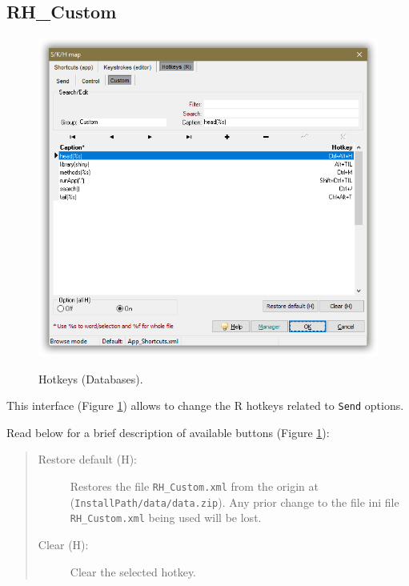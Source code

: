 \subsection{RH\_Custom}

\begin{figure}[H]
  \includegraphics[scale=0.35]{./res/skh_map_rh_custom_dlg.png}\\
  \caption{Hotkeys (Databases).}
  \label{fig:rh_custom_dlg}
\end{figure}

This interface
(Figure \ref{fig:rh_custom_dlg})
allows to change the R hotkeys related to \texttt{Send} options.

Read below for a brief description of available buttons (Figure \ref{fig:rh_custom_dlg}):

\begin{quote}
  \begin{footnotesize}
    \begin{description}
      \item[Restore default (H):]
        Restores the file \texttt{RH\_Custom.xml} from the origin at
        (\texttt{InstallPath/data/data.zip}). Any prior change to the file ini file
        \texttt{RH\_Custom.xml} being used will be lost.
      \item[Clear (H):]
        Clear the selected hotkey.
    \end{description}
  \end{footnotesize}
\end{quote}


